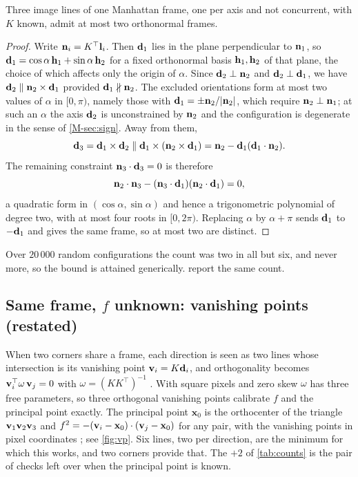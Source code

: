 \begin{proposition}\label{prop:threelines}
Three image lines of one Manhattan frame, one per axis and not concurrent, with $K$ known, admit at most two orthonormal frames.
\end{proposition}
\begin{proof}
Write $\mathbf{n}_i=K^{\top}\mathbf{l}_i$. Then $\mathbf{d}_1$ lies in the plane perpendicular to $\mathbf{n}_1$, so $\mathbf{d}_1=\cos\alpha\,\mathbf{h}_1+\sin\alpha\,\mathbf{h}_2$ for a fixed orthonormal basis $\mathbf{h}_1,\mathbf{h}_2$ of that plane, the choice of which affects only the origin of $\alpha$. Since $\mathbf{d}_2\perp\mathbf{n}_2$ and $\mathbf{d}_2\perp\mathbf{d}_1$, we have $\mathbf{d}_2\parallel\mathbf{n}_2\times\mathbf{d}_1$ provided $\mathbf{d}_1\nparallel\mathbf{n}_2$. The excluded orientations form at most two values of $\alpha$ in $[0,\pi)$, namely those with $\mathbf{d}_1=\pm\mathbf{n}_2/|\mathbf{n}_2|$, which require $\mathbf{n}_2\perp\mathbf{n}_1$; at such an $\alpha$ the axis $\mathbf{d}_2$ is unconstrained by $\mathbf{n}_2$ and the configuration is degenerate in the sense of \cref{M-sec:sign}. Away from them,
\[
\mathbf{d}_3=\mathbf{d}_1\times\mathbf{d}_2\parallel\mathbf{d}_1\times(\mathbf{n}_2\times\mathbf{d}_1)=\mathbf{n}_2-\mathbf{d}_1(\mathbf{d}_1\cdot\mathbf{n}_2).
\]
The remaining constraint $\mathbf{n}_3\cdot\mathbf{d}_3=0$ is therefore
\[
\mathbf{n}_2\cdot\mathbf{n}_3-(\mathbf{n}_3\cdot\mathbf{d}_1)(\mathbf{n}_2\cdot\mathbf{d}_1)=0 ,
\]
a quadratic form in $(\cos\alpha,\sin\alpha)$ and hence a trigonometric polynomial of degree two, with at most four roots in $[0,2\pi)$. Replacing $\alpha$ by $\alpha+\pi$ sends $\mathbf{d}_1$ to $-\mathbf{d}_1$ and gives the same frame, so at most two are distinct.
\end{proof}
Over $20\,000$ random configurations the count was two in all but six, and never more, so the bound is attained generically.  report the same count.

\subsection{Same frame, \texorpdfstring{$f$}{f} unknown: vanishing points (restated)}\label{sec:vp}

When two corners share a frame, each direction is seen as two lines whose intersection is its vanishing point $\mathbf{v}_i=K\mathbf{d}_i$, and orthogonality becomes $\mathbf{v}_i^{\top}\omega\,\mathbf{v}_j=0$ with $\omega=(KK^{\top})^{-1}$ \citep{hartley2004}. With square pixels and zero skew $\omega$ has three free parameters, so three orthogonal vanishing points calibrate $f$ and the principal point exactly. The principal point $\mathbf{x}_0$ is the orthocenter of the triangle $\mathbf{v}_1\mathbf{v}_2\mathbf{v}_3$ and $f^2=-(\mathbf{v}_i-\mathbf{x}_0)\cdot(\mathbf{v}_j-\mathbf{x}_0)$ for any pair, with the vanishing points in pixel coordinates \citep{caprile1990}; see \cref{fig:vp}. Six lines, two per direction, are the minimum for which this works, and two corners provide that. The $+2$ of \cref{tab:counts} is the pair of checks left over when the principal point is known.

